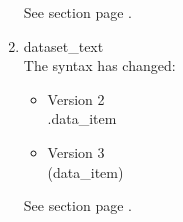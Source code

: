 \begin{enumerate}
See section  page \pageref{fig:st_format_command}. \\
\item dataset\_text \\
The syntax has changed:
\begin{itemize}
\item Version 2 \\
\DATASETTEXT.data\_item \\
\item Version 3 \\
\DATASETTEXT (data\_item) \\
\end{itemize}
See section  page \pageref{fig:st_format_command}. \\


\end{enumerate}
